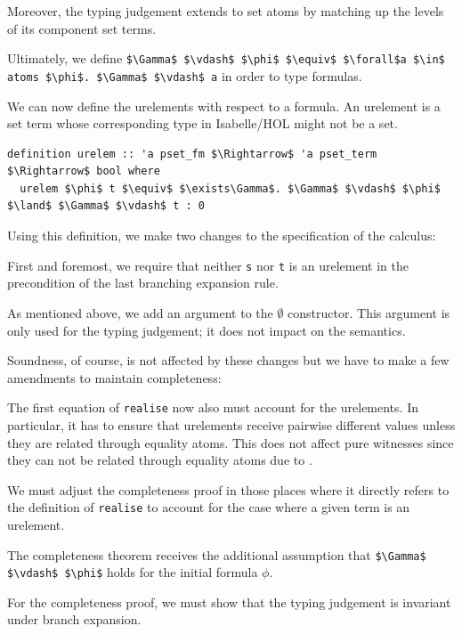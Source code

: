 \documentclass[runningheads]{llncs}
\begin{document}
Moreover, the typing judgement extends to set atoms by matching up the levels of its component set terms.

Ultimately, we define \lstinline!$\Gamma$ $\vdash$ $\phi$ $\equiv$ $\forall$a $\in$ atoms $\phi$. $\Gamma$ $\vdash$ a! in order to type formulas.

We can now define the urelements with respect to a formula.
An urelement is a set term whose corresponding type in Isabelle/HOL might not be a set.
\begin{lstlisting}
definition urelem :: 'a pset_fm $\Rightarrow$ 'a pset_term $\Rightarrow$ bool where
  urelem $\phi$ t $\equiv$ $\exists\Gamma$. $\Gamma$ $\vdash$ $\phi$ $\land$ $\Gamma$ $\vdash$ t : 0
\end{lstlisting}
Using this definition, we make two changes to the specification of the calculus: 
\begin{enumerate*}[label=(\arabic*)]
  \item First and foremost, we require that neither \lstinline!s! nor \lstinline!t! is an urelement in the precondition of the last branching expansion rule.
  \item As mentioned above, we add an argument to the $\emptyset$ constructor.
    This argument is only used for the typing judgement; it does not impact on the semantics.
\end{enumerate*}

Soundness, of course, is not affected by these changes but we have to make a few amendments to maintain completeness:
\begin{enumerate*}[label=(\arabic*)]
  \item The first equation of \lstinline!realise! now also must account for the urelements.
    In particular, it has to ensure that urelements receive pairwise different values unless they are related through equality atoms. 
    This does not affect pure witnesses since they can not be related through equality atoms due to .
  \item We must adjust the completeness proof in those places where it directly refers to the definition of \lstinline!realise! to account for the case where a given term is an urelement.
  \item The completeness theorem receives the additional assumption that \lstinline!$\Gamma$ $\vdash$ $\phi$! holds for the initial formula $\phi$. 
  \item For the completeness proof, we must show that the typing judgement is invariant under branch expansion.
\end{enumerate*}
\end{document}
